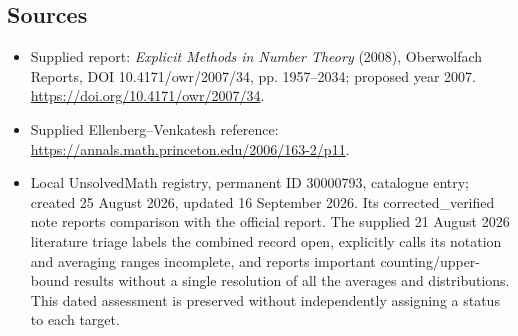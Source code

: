 \documentclass[11pt]{article}
\begin{document}
\subsection{Sources}
\begin{itemize}
\item Supplied report: \emph{Explicit Methods in Number Theory} (2008), Oberwolfach Reports, DOI 10.4171/owr/2007/34, pp. 1957--2034; proposed year 2007. \url{https://doi.org/10.4171/owr/2007/34}.
\item Supplied Ellenberg--Venkatesh reference: \url{https://annals.math.princeton.edu/2006/163-2/p11}.
\item Local UnsolvedMath registry, permanent ID 30000793, catalogue entry; created 25 August 2026, updated 16 September 2026. Its corrected\_verified note reports comparison with the official report. The supplied 21 August 2026 literature triage labels the combined record open, explicitly calls its notation and averaging ranges incomplete, and reports important counting/upper-bound results without a single resolution of all the averages and distributions. This dated assessment is preserved without independently assigning a status to each target.
\end{itemize}
\end{document}

